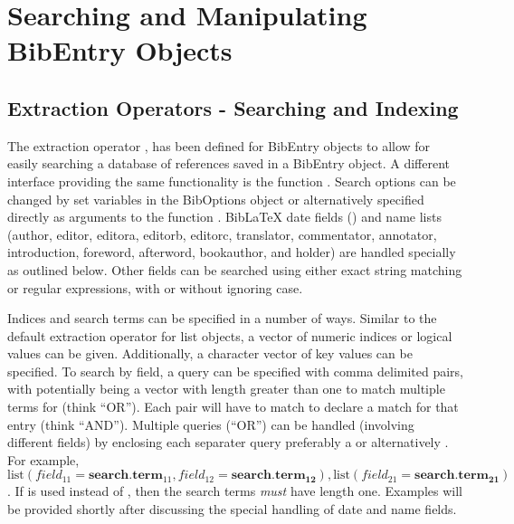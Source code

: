 \documentclass[article]{jss}\usepackage[]{graphicx}\usepackage[]{color}
\begin{document}
\section{Searching and Manipulating BibEntry Objects}
\subsection{Extraction Operators - Searching and Indexing}\label{searchsec}
The extraction operator \code{'['}, has been defined for BibEntry objects to allow for easily searching a database of references saved in a BibEntry object.  A different interface providing the same functionality is the function .  Search options can be changed by set variables in the BibOptions object or alternatively specified directly as arguments to the function .  BibLaTeX date fields () and name lists (author, editor, editora, editorb, editorc, translator, commentator, annotator, introduction, foreword, afterword, bookauthor, and holder) are handled specially as outlined below.  Other fields can be searched using either exact string matching or regular expressions, with or without ignoring case.

Indices and search terms can be specified in a number of ways.  Similar to the default extraction operator for list objects, a vector of numeric indices or logical values can be given.  Additionally, a character vector of key values can be specified.  To search by field, a query can be specified with comma delimited  pairs, with  potentially being a vector with length greater than one to match multiple terms for  (think ``OR'').  Each  pair will have to match to declare a match for that entry (think ``AND'').  Multiple queries (``OR'') can be handled (involving different fields) by enclosing each separater query preferably a  or alternatively .  For example, $\text{list}(field_{11} = \mathbf{search.term}_{11},field_{12}=\mathbf{search.term_{12}}),\text{list}(field_{21}=\mathbf{search.term_{21}})$.  If  is used instead of , then the search terms \emph{must} have length one.  Examples will be provided shortly after discussing the special handling of date and name fields.  
\end{document}
